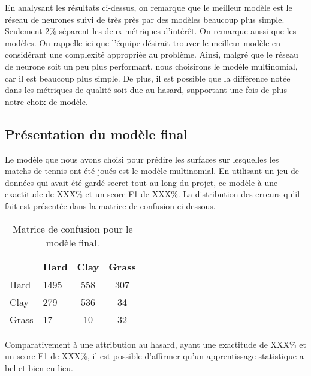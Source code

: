 En analysant les résultats ci-dessus, on remarque que le meilleur modèle est le réseau de neurones suivi de très près par des modèles beaucoup plus simple. Seulement 2\% séparent les deux métriques d'intérêt. On remarque aussi que les modèles. On rappelle ici que l'équipe désirait trouver le meilleur modèle en considérant une complexité appropriée au problème. Ainsi, malgré que le réseau de neurone soit un peu plus performant, nous choisirons le modèle multinomial, car il est beaucoup plus simple. De plus, il est possible que la différence notée dans les métriques de qualité soit due au hasard, supportant une fois de plus notre choix de modèle. 
 
\subsection{Présentation du modèle final}

Le modèle que nous avons choisi pour prédire les surfaces sur lesquelles les matchs de tennis ont été joués est le modèle multinomial. En utilisant un jeu de données qui avait été gardé secret tout au long du projet, ce modèle à une exactitude de XXX\% et un score F1 de XXX\%. La distribution des erreurs qu'il fait est présentée dans la matrice de confusion ci-dessous.

\begin{table}[H]
	
	\caption{\label{tab:matrice_confusion}Matrice de confusion pour le modèle final.}
	\centering
	\begin{tabular}[t]{llcc}
		\hiderowcolors
		\toprule
		& Hard & Clay & Grass\\
		\midrule
		\showrowcolors
		Hard & 1495 & 558 & 307\\
		Clay & 279 & 536 & 34\\
		Grass & 17 & 10 & 32\\
		\bottomrule
	\end{tabular}
\end{table}

Comparativement à une attribution au hasard, ayant une exactitude de XXX\% et un score F1 de XXX\%, il est possible d'affirmer qu'un apprentissage statistique a bel et bien eu lieu. 